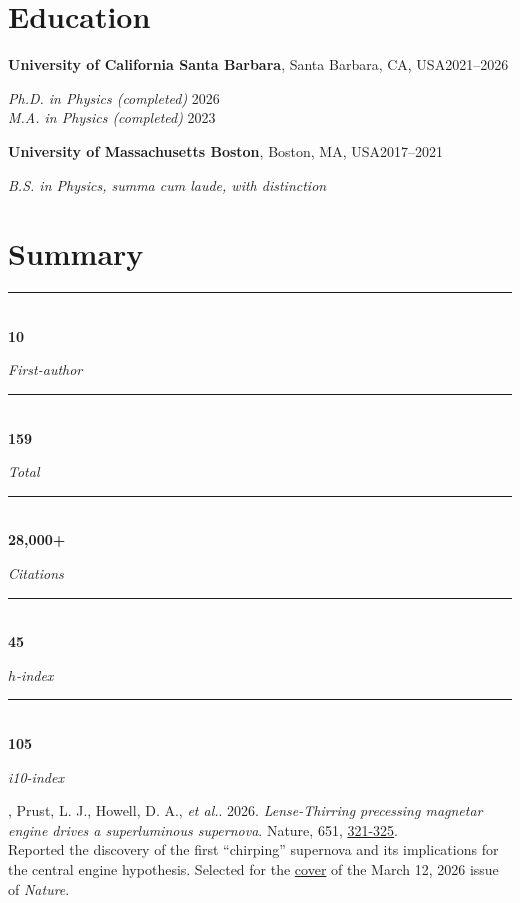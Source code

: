 \documentclass[margin,line]{res}
\newcommand{\nat}{Nature}                 %
\newlength{\cardwd}
\newlength{\cardgap}
\newcommand{\setcardcols}[1]{%
  \setlength{\cardwd}{%
    \dimexpr(\linewidth-\numexpr#1-1\relax\cardgap)/#1\relax}}
\newcommand{\statcard}[2]{%
  \begin{minipage}[t]{\cardwd}
    {\color{Maroon}\rule{\linewidth}{1.1pt}}\\[0.9mm]
    {\fontsize{19}{19}\selectfont\bfseries #1}\\[0.4mm]
    {\footnotesize\color{gray}\raggedright\textit{#2}\par}
  \end{minipage}\hfill}
\newcommand{\statcites}{28{,}000+}
\newcommand{\statrefd}{159}
\newcommand{\stath}{45}
\newcommand{\stati}{105}
\newcommand{\statfapapers}{10}
\begin{document}
\begin{resume}
\vspace*{-1mm}
\section{\sc Education}
\label{sec:education}

{\bf University of California Santa Barbara}, Santa Barbara, CA, USA\hfill 2021--2026

\vspace{-.35cm}
{\em Ph.D. in Physics (completed)} \hfill 2026\\
{\em M.A. in Physics (completed) } \hfill 2023

{\bf University of Massachusetts Boston}, Boston, MA, USA\hfill 2017--2021

\vspace{-.35cm}
{\em B.S. in Physics, summa cum laude, with distinction}




\section{ Summary}
\vspace*{-1.7mm}   %

\setcardcols{5}\noindent
\statcard{\statfapapers}{First-author}
\statcard{\statrefd}{Total}
\statcard{\statcites}{Citations}
\statcard{\stath}{$h$-index}
\statcard{\stati}{i10-index}

\begin{mdframed}[linecolor=Maroon]
\vspace{+.3cm}
\vspace{-.2cm}

{\leftskip=5mm
, Prust, L. J., Howell, D. A., \textit{et al.}. 2026.
\textit{Lense-Thirring precessing magnetar engine drives a superluminous supernova}.
{\color{Maroon}\nat}, 651, \href{...}{321-325}. \\
{\color{gray} Reported the discovery of the first ``chirping'' supernova and its implications for the central engine hypothesis. Selected for the \href{https://www.nature.com/nature/volumes/651/issues/8105}{cover} of the March 12, 2026 issue of \textit{Nature}.}

}
\end{mdframed}
\end{resume}
\end{document}
